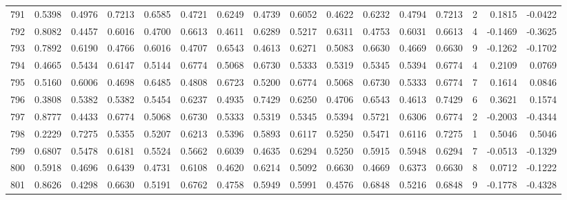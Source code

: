 \begin{tabular}{lrrrrrrrrrrrrrrr}
791 &      0.5398 &  0.4976 &  0.7213 &  0.6585 &  0.4721 &  0.6249 &  0.4739 &  0.6052 &  0.4622 &  0.6232 &   0.4794 &     0.7213 &      2 &                    0.1815 &                    -0.0422 \\
792 &      0.8082 &  0.4457 &  0.6016 &  0.4700 &  0.6613 &  0.4611 &  0.6289 &  0.5217 &  0.6311 &  0.4753 &   0.6031 &     0.6613 &      4 &                   -0.1469 &                    -0.3625 \\
793 &      0.7892 &  0.6190 &  0.4766 &  0.6016 &  0.4707 &  0.6543 &  0.4613 &  0.6271 &  0.5083 &  0.6630 &   0.4669 &     0.6630 &      9 &                   -0.1262 &                    -0.1702 \\
794 &      0.4665 &  0.5434 &  0.6147 &  0.5144 &  0.6774 &  0.5068 &  0.6730 &  0.5333 &  0.5319 &  0.5345 &   0.5394 &     0.6774 &      4 &                    0.2109 &                     0.0769 \\
795 &      0.5160 &  0.6006 &  0.4698 &  0.6485 &  0.4808 &  0.6723 &  0.5200 &  0.6774 &  0.5068 &  0.6730 &   0.5333 &     0.6774 &      7 &                    0.1614 &                     0.0846 \\
796 &      0.3808 &  0.5382 &  0.5382 &  0.5454 &  0.6237 &  0.4935 &  0.7429 &  0.6250 &  0.4706 &  0.6543 &   0.4613 &     0.7429 &      6 &                    0.3621 &                     0.1574 \\
797 &      0.8777 &  0.4433 &  0.6774 &  0.5068 &  0.6730 &  0.5333 &  0.5319 &  0.5345 &  0.5394 &  0.5721 &   0.6306 &     0.6774 &      2 &                   -0.2003 &                    -0.4344 \\
798 &      0.2229 &  0.7275 &  0.5355 &  0.5207 &  0.6213 &  0.5396 &  0.5893 &  0.6117 &  0.5250 &  0.5471 &   0.6116 &     0.7275 &      1 &                    0.5046 &                     0.5046 \\
799 &      0.6807 &  0.5478 &  0.6181 &  0.5524 &  0.5662 &  0.6039 &  0.4635 &  0.6294 &  0.5250 &  0.5915 &   0.5948 &     0.6294 &      7 &                   -0.0513 &                    -0.1329 \\
800 &      0.5918 &  0.4696 &  0.6439 &  0.4731 &  0.6108 &  0.4620 &  0.6214 &  0.5092 &  0.6630 &  0.4669 &   0.6373 &     0.6630 &      8 &                    0.0712 &                    -0.1222 \\
801 &      0.8626 &  0.4298 &  0.6630 &  0.5191 &  0.6762 &  0.4758 &  0.5949 &  0.5991 &  0.4576 &  0.6848 &   0.5216 &     0.6848 &      9 &                   -0.1778 &                    -0.4328 \\

\end{tabular}
